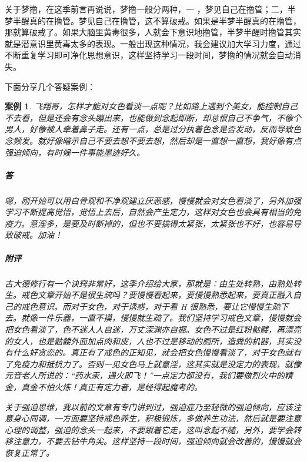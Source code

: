 \documentclass{ctexart}
\newtheorem{case}{案例}
\begin{document}
关于梦撸，在这季前言再说说，梦撸一般分两种，一 ，梦见自己在撸管；二，半梦半醒真的在撸管。梦见自己在撸管，这不算破戒。如果是半梦半醒真的在撸管，那就算破戒了。如果大脑里黄毒很多，人就会下意识地撸管，半梦半醒时撸管其实就是潜意识里黄毒太多的表现。一般出现这种情况，我会建议加大学习力度，通过不断重复学习即可净化思想意识，这样坚持学习一段时间，梦撸的情况就会自动消失。

下面分享几个答疑案例：

\begin{case}
    飞翔哥，怎样才能对女色看淡一点呢？比如路上遇到个美女，能控制自己不去看，但是还会有念头蹦出来，也能做到念起即断，却总恨自己不争气，不像个男人，好像被人牵着鼻子走。还有一点，总是过分执着色念是否发动，反而导致色念频发。就好像暗示自己不要去想不要去想，然后却是一直想一直想，我好像有点强迫倾向，有时候一件事能墨迹好久。
    \subparagraph{答} 嗯，刚开始可以用白骨观和不净观建立厌恶感，慢慢就会对女色看淡了，另外加强学习不断提高觉悟，觉悟上去后，自然会产生定力，这样对女色也会具有相当的免疫力。意淫多，是要及时断掉的，但也不要搞得太紧张，太紧张也不好，也容易导致破戒。加油！
    \subparagraph{附评} 古大德修行有一个诀窍非常好，这季介绍给大家，那就是：由生处转熟，由熟处转生。戒色文章开始不是很生疏吗？要慢慢看起来，要慢慢熟悉起来，要真正融入自己的戒色意识。而对于女色，对于诱惑，对于看 H 很熟悉，要让它慢慢生疏下去。就像一件乐器，一直不摸，慢慢就生疏了。我们坚持学习戒色文章，慢慢就会把女色看淡了，色不迷人人自迷，万丈深渊亦自掘。女色不过是红粉骷髅，再漂亮的女人，也是骷髅外面加点肉和皮，人也不过是移动的厕所，造粪的机器，其实没有什么好贪恋的。真正有了戒色的正知见，就会把女色慢慢看淡了，对于女色就有了免疫力和抵抗力了。否则一见女色马上就意淫，这其实就是没定力的表现，就像元音老人所说的：“药水汞，遇火即飞！”一点定力都没有，我们要做烈火中的精金，真金不怕火炼！真正有定力者，是经得起魔考的。

    关于强迫思维，我以前的文章有专门讲到过，强迫症乃至轻微的强迫倾向，应该注意身心同调，一方面要坚持戒色养生，积极锻炼，多做养生功法，然后就是要注意心理的调整，强迫的念头一起来，不要跟着它走，这叫念起不随，另外，要学会转移注意力，不要去钻牛角尖。这样坚持一段时间，强迫倾向就会改善的，慢慢就会恢复正常了。
\end{case}
\end{document}
